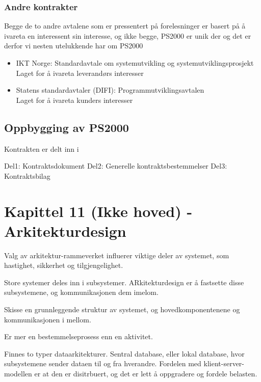 \documentclass[11pt]{article}
\begin{document}
\subsubsection{Andre kontrakter}
\label{sec-11.3.1}

    
    Begge de to andre avtalene som er pressentert på forelesninger er basert
    på å ivareta en interessent sin interesse, og ikke begge, PS2000 er unik der
    og det er derfor vi nesten utelukkende har om PS2000
\begin{itemize}

\item IKT Norge: Standardavtale om systemutvikling og systemutviklingsprosjekt\\
\label{sec-11.3.1.1}%
Laget for å ivareta leverandørs interesser

\item Statens standardavtaler (DIFI): Programmutviklingsavtalen\\
\label{sec-11.3.1.2}%
Laget for å ivareta kunders interesser

\end{itemize} %
\subsection{Oppbygging av PS2000}
\label{sec-11.4}

   Kontrakten er delt inn i

   Del1: Kontraktsdokument 
   Del2: Generelle kontraktsbestemmelser 
   Del3: Kontraktsbilag
\section{Kapittel 11 (Ikke hoved) - Arkitekturdesign}
\label{sec-12}

  Valg av arkitektur-rammeverket influerer viktige deler av systemet, som hastighet, sikkerhet og tilgjengelighet. 

  Store systemer deles inn i subsystemer. ARkitekturdesign er å fastsette disse subsystemene, og kommunikasjonen dem imelom.
  
  Skisse en grunnleggende struktur av systemet, og hovedkomponentenene og kommunikasjonen i mellom.

  Er mer en bestemmelseprosess enn en aktivitet. 

  Finnes to typer dataarkitekturer. Sentral database, eller lokal database, hvor subsystemene sender dataen til og fra hverandre. Fordelen med klient-server-modellen er at den er disitrbuert, og det er lett å oppgradere og fordele belasten.
\end{document}
